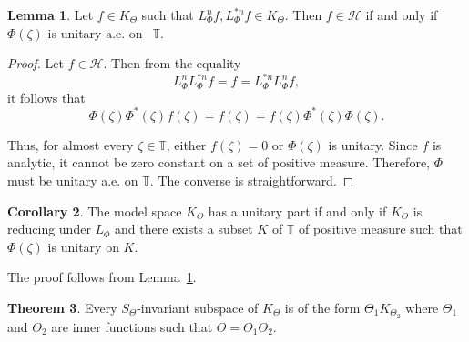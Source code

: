 \documentclass{amsart}
\theoremstyle{definition}
\newtheorem{thm}{Theorem}[section]
\newtheorem{cor}[thm]{Corollary}
\newtheorem{lem}[thm]{Lemma}
\newcommand{\h}{\mathcal{\mathcal H}}
\newcommand{\hsp}{\mathcal{H}}
\begin{document}
\begin{lem}\label{unitary part}
     Let $f\in K_\Theta$ such that $L^n_{\Phi}f, L^{*n}_{\Phi}f\in K_\Theta$. Then $f\in\h$  if and only if $\Phi(\zeta)$ is unitary $\text{a.e. on } ~~\mathbb{T}.$
\end{lem}

\begin{proof} Let $f\in \hsp$. Then from the equality
$$L_{\Phi}^n L_{\Phi}^{*n} f = f = L_{\Phi}^{*n} L_{\Phi}^n f,$$ it follows that
$$\Phi(\zeta)\Phi^{*}(\zeta)f(\zeta)=f(\zeta)=f(\zeta)\Phi^{*}(\zeta)\Phi(\zeta).$$
\vskip3pt

\noindent Thus, for almost every $\zeta\in \mathbb{T}$, %
 either $f(\zeta)=0$ or $\Phi(\zeta)$ is unitary.  Since $f$ is analytic, it cannot be zero constant on a set of positive measure. Therefore, $\Phi$ must be unitary a.e. on $\mathbb{T}$. The converse is straightforward.
\end{proof}



\begin{cor}
The model space $K_{\Theta}$ has a unitary part if and only if $K_{\Theta}$ is reducing under $L_{\Phi}$ and there exists a subset $K$ of $\mathbb{T}$ of positive measure such that $\Phi(\zeta)$ is unitary on $K$.
\end{cor}
The proof follows from Lemma~\ref{unitary part}.

\begin{thm}\label{Stheta}
     Every $S_\Theta$-invariant subspace of $K_\Theta$ is of the form
     $\Theta_{1} K_{\Theta_2}$ where $\Theta_1$ and $\Theta_2$ are inner functions such that $\Theta=\Theta_1\Theta_2$.
\end{thm}
\end{document}
